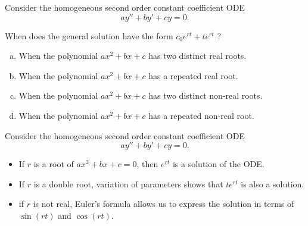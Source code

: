 \begin{applicationActivities}
\begin{activity}{5}
Consider the homogeneous second order constant coefficient ODE \[ay''+by'+cy=0.\]

When does the general solution have the form \(c_0 e^{rt}+te^{rt}\) ?
\begin{enumerate}[(a)]
\item When the polynomial \(ax^2+bx+c\) has two distinct real roots.
\item When the polynomial \(ax^2+bx+c\) has a repeated real root.
\item When the polynomial \(ax^2+bx+c\) has two distinct non-real roots.
\item When the polynomial \(ax^2+bx+c\) has a repeated non-real root.
\end{enumerate}
\end{activity}


\begin{observation}
Consider the homogeneous second order constant coefficient ODE \[ay''+by'+cy=0.\]
\vfill
\begin{itemize}
\item If \(r\) is a root of \(ax^2+bx+c=0\), then \(e^{rt}\) is a solution of the ODE.
\item If \(r\) is a double root, variation of parameters shows that \(te^{rt}\) is also a solution.
\item if \(r\) is not real, Euler's formula allows us to express the solution in terms of \(\sin(rt)\) and \(\cos(rt)\).
\end{itemize}
\end{observation}




\end{applicationActivities}

